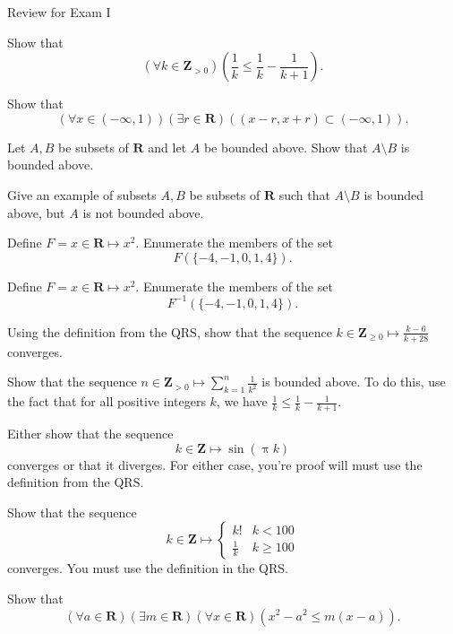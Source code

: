 \documentclass[12pt,fleqn,answers]{exam}
\newcommand{\reals}{\mathbf{R}}
\newcommand{\integers}{\mathbf{Z}}
\newcommand{\quiz}{Review for Exam I}
\newcommand{\term}{Fall}
\begin{document}
\large
\quiz


\begin{questions} 




\question Show that 
\[
    \left(\forall k \in \integers_{>0} \right) 
      \left(\frac{1}{k} \leq \frac{1}{k} - \frac{1}{k+1} \right).
\]

\question Show that
\[
    \left(\forall x \in (-\infty, 1) \right)\left( \exists r \in \reals \right)
    \left((x-r,x+r) \subset (-\infty, 1) \right).
\]

\question Let $A,B$ be subsets of $\reals$ and let $A$ be bounded above.
Show that $A \setminus B$ is bounded above.

\question Give an example of subsets $A,B$ be subsets of $\reals$
such that $A \setminus B$ is bounded above, but $A$ is not bounded
above.

\question Define $F = x \in \reals \mapsto x^2$.  Enumerate the members of the set
\[
      F(\{-4,-1,0,1,4 \}).
    \]

\question Define $F = x \in \reals \mapsto x^2$.  Enumerate the members of the set
\[
      F^{-1}(\{-4,-1,0,1,4 \}).
\]

\question Using the definition from the QRS, show that the sequence 
$k \in \integers_{\geq 0} \mapsto \frac{k-6}{k+28}$ converges.

\question Show that the sequence $n \in \integers_{>0} \mapsto \sum_{k=1}^n \frac{1}{k^2}$ is
bounded above. To do this, use the fact that for all positive integers $k$, we have 
$\frac{1}{k} \leq \frac{1}{k} - \frac{1}{k+1}$.

\question Either show that the sequence
\[
      k \in \integers \mapsto \sin(\uppi k)
\]
converges or that it diverges. For either case, you're proof will
must use the definition from the QRS.

\question Show that the sequence
\[
    k \in \integers \mapsto \begin{cases} k!  & k < 100\\
        \frac{1}{k}  & k \geq  100 \end{cases}
\]
converges. You must use the definition in the QRS.

\question Show that
\[
    \left(\forall a \in \reals \right) \left(\exists m \in \reals \right)
    \left(\forall x \in \reals \right) \left(x^2 - a^2 \leq m (x-a) \right).
\]
\end{questions}
\end{document}
